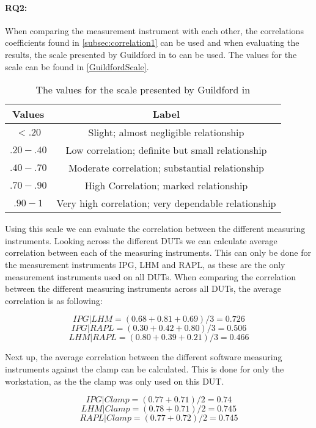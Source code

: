 \paragraph{RQ2:} When comparing the measurement instrument with each other, the correlations coefficients found in \cref{subsec:correlation1} can be used and when evaluating the results, the scale presented by Guildford in \cite[219]{guilford1950fundamental} to can be used. The values for the scale can be found in \cref{GuildfordScale}.


\begin{table}[ht]
    \centering
    \begin{tabular}{|| c | c ||}
        \hline
        \textbf{Values} & \textbf{Label} \\ [0.5ex] \hline\hline
        $<.20$ & Slight; almost negligible relationship \\
        $.20-.40$ & Low correlation; definite but small relationship \\
        $.40-.70$ & Moderate correlation; substantial relationship \\
        $.70-.90$ & High Correlation; marked relationship \\
        $.90-1$ & Very high correlation; very dependable relationship \\ \hline
    \end{tabular}
    \caption{The values for the scale presented by Guildford in \cite[219]{guilford1950fundamental} }
    \label{tab:GuildfordScale}
\end{table}

Using this scale we can evaluate the correlation between the different measuring instruments. Looking across the different DUTs we can calculate average correlation between each of the measuring instruments. This can only be done for the measurement instruments IPG, LHM and RAPL, as these are the only measurement instruments used on all DUTs. When comparing the correlation between the different measuring instruments across all DUTs, the average correlation is as following:

$$IPG|LHM = (0.68+0.81+0.69)/3 = 0.726$$
$$IPG|RAPL = (0.30+0.42+0.80)/3 = 0.506$$
$$LHM|RAPL = (0.80+0.39+0.21)/3 = 0.466$$

Next up, the average correlation between the different software measuring instruments against the clamp can be calculated. This is done for only the workstation, as the the clamp was only used on this DUT.

$$IPG|Clamp = (0.77+0.71)/2 = 0.74$$
$$LHM|Clamp = (0.78+0.71)/2 = 0.745$$
$$RAPL|Clamp = (0.77+0.72)/2 = 0.745$$

